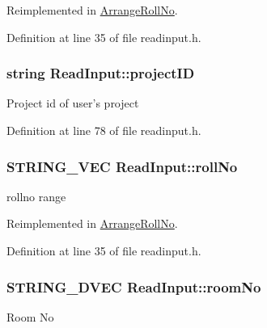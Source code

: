 \-Reimplemented in \hyperlink{classArrangeRollNo_ac70b1f6e601cc5786ef339a38ae18c6f}{\-Arrange\-Roll\-No}.



\-Definition at line 35 of file readinput.\-h.

\hypertarget{classReadInput_a3ad470a25b3e0a29466bf4ff1f7d8e81}{
\subsubsection[{project\-I\-D}]{\setlength{\rightskip}{0pt plus 5cm}string {\bf \-Read\-Input\-::project\-I\-D}}}\label{classReadInput_a3ad470a25b3e0a29466bf4ff1f7d8e81}
\-Project id of user's project 

\-Definition at line 78 of file readinput.\-h.

\hypertarget{classReadInput_a862fbffdffa56fc6d66b1d1f14dae087}{
\subsubsection[{roll\-No}]{\setlength{\rightskip}{0pt plus 5cm}\-S\-T\-R\-I\-N\-G\-\_\-\-V\-E\-C {\bf \-Read\-Input\-::roll\-No}}}\label{classReadInput_a862fbffdffa56fc6d66b1d1f14dae087}
rollno range 

\-Reimplemented in \hyperlink{classArrangeRollNo_ad75d3ee3f709606da5b4871098c3e978}{\-Arrange\-Roll\-No}.



\-Definition at line 35 of file readinput.\-h.

\hypertarget{classReadInput_a77f996670554c8a752e7cbd713ecb084}{
\subsubsection[{room\-No}]{\setlength{\rightskip}{0pt plus 5cm}\-S\-T\-R\-I\-N\-G\-\_\-D\-V\-E\-C {\bf \-Read\-Input\-::room\-No}}}\label{classReadInput_a77f996670554c8a752e7cbd713ecb084}
\-Room \-No 

